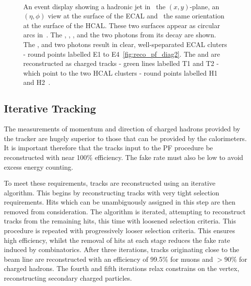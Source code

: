 \begin{figure}[h!]
\centering
{}\\
\quad
{}
\caption[]{An event display showing a hadronic jet in~
  the $(x,y)$-plane,  an $(\eta,\phi)$ view at the
  surface of the \ac{ECAL} and~ the same orientation
  at the surface of the \ac{HCAL}. These two surfaces appear as circular arcs
  in~. The \PKlong, \Ppiminus, \Ppiplus, \Ppizero and
  the two photons from its decay are shown. The \PKlong, \Ppiminus and two photons
  result in clear, well-speparated \ac{ECAL} cluters - round points labelled E1
  to E4~\ref{fig:reco_pf_diag2}. The \Ppiplus and \Ppiminus are reconstructed as
  charged tracks - green lines labelled T1 and T2 - which point to the two
  \ac{HCAL} clusters - round points labelled H1 and H2~\cite{cms_pf_pas}.}
\label{fig:reco_pf_diag}
\end{figure}

\subsection{Iterative Tracking}
The measurements of momentum and direction of charged hadrons provided by the
tracker are hugely superior to those that can be provided by the calorimeters.
It is important therefore that the tracks input to the \ac{PF} procedure be
reconstructed with near 100\% efficiency. The fake rate must also be low to
avoid excess energy counting.

To meet these requirements, tracks are reconstructed using an iterative
algorithm. This begins by reconstructing tracks with very tight selection
requirements. Hits which can be unambiguously assigned in this step are then
removed from consideration. The algorithm is iterated, attempting to reconstruct
tracks from the remaining hits, this time with loosened selection criteria. This
procedure is repeated with progressively looser selection criteria. This ensures
high efficiency, whilst the removal of hits at each stage reduces the fake rate
induced by combinatorics.  After three iterations, tracks originating close to
the beam line are reconstructed with an efficiency of 99.5\% for muons and
$>90\%$ for charged hadrons. The fourth and fifth iterations relax constrains on
the vertex, reconstructing secondary charged particles.


